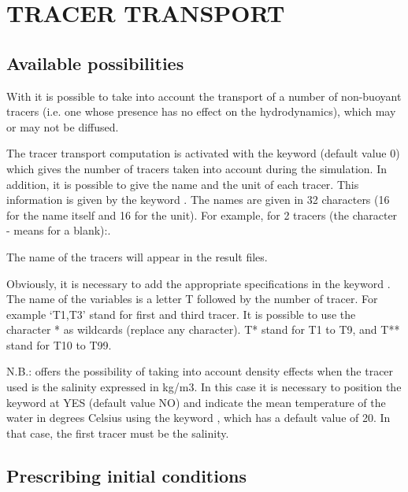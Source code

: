 

\chapter{ TRACER TRANSPORT}
\label{ch:tra:trans}

\section{Available possibilities}

 With  it is possible to take into account the transport of a number of non-buoyant tracers (i.e. one whose presence has no effect on the hydrodynamics), which may or may not be diffused.

 The tracer transport computation is activated with the keyword  (default value 0) which gives the number of tracers taken into account during the simulation. In addition, it is possible to give the name and the unit of each tracer. This information is given by the keyword . The names are given in 32 characters (16 for the name itself and 16 for the unit). For example, for 2 tracers (the character - means for a blank):.

 The name of the tracers will appear in the result files.

 Obviously, it is necessary to add the appropriate specifications in the keyword . The name of the variables is a letter T followed by the number of tracer. For example `T1,T3' stand for first and third tracer. It is possible to use the character * as wildcards (replace any character). T* stand for T1 to T9, and T** stand for T10 to T99.

 N.B.:  offers the possibility of taking into account density effects when the tracer used is the salinity expressed in kg/m3. In this case it is necessary to position the keyword  at YES (default value NO) and indicate the mean temperature of the water in degrees Celsius using the keyword , which has a default value of 20. In that case, the first tracer must be the salinity.


\section{Prescribing initial conditions }

